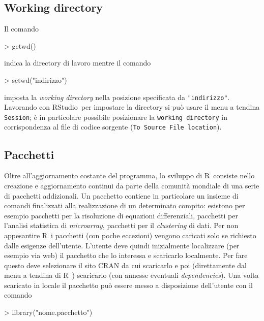 \documentclass[onecolumn,11pt]{book}
\newcommand{\rst}{\textsf{RStudio}~}
\newcommand{\rpr}{\textsf{R}~}
\begin{document}
\subsection*{Working directory}
Il comando  
\begin{Schunk}
\begin{Sinput}
> getwd()
\end{Sinput}
\end{Schunk}
indica la directory di lavoro mentre il comando 
\begin{Schunk}
\begin{Sinput}
> setwd("indirizzo")
\end{Sinput}
\end{Schunk}
 imposta la {\it working directory}  nella posizione specificata da \texttt{"indirizzo"}. 
 Lavorando con \rst per impostare la directory si pu\`o usare il menu a tendina
\texttt{Session};  \`e  in particolare  possibile posizionare la \texttt{working directory} in corrispondenza al file di codice sorgente (\texttt{To Source File location}). 


\subsection*{Pacchetti}

Oltre all'aggiornamento costante del programma, lo sviluppo di \rpr consiste nello creazione e aggiornamento continui da parte della comunit\`a  mondiale di una serie di pacchetti addizionali. Un pacchetto contiene in particolare un insieme di comandi finalizzati alla  realizzazione di un determinato compito: esistono per esempio pacchetti per la risoluzione di equazioni differenziali, pacchetti per l'analisi statistica di {\it microarray}, pacchetti per il {\it clustering} di dati.  Per non appesantire \rpr i pacchetti (con poche eccezioni) vengono caricati solo se richiesto dalle esigenze dell'utente. 
L'utente deve quindi inizialmente localizzare (per esempio via web) il pacchetto che lo interessa e scaricarlo localmente.  
Per fare questo deve selezionare il sito CRAN da cui scaricarlo e poi (direttamente dal menu a tendina di \rpr) scaricarlo (con annesse eventuali {\it dependencies}). Una volta scaricato in locale il pacchetto pu\`o essere messo a disposizione dell'utente con il comando  
\begin{Schunk}
\begin{Sinput}
> library("nome.pacchetto")
\end{Sinput}
\end{Schunk}
\end{document}
